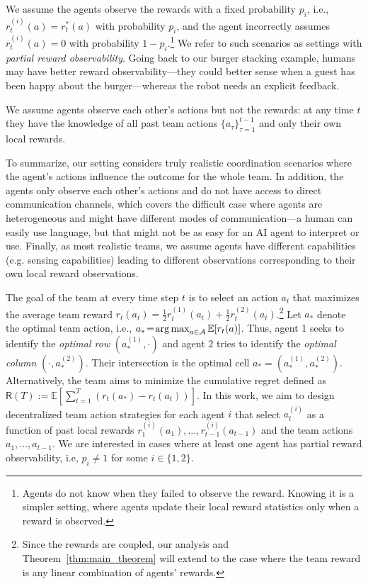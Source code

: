 \documentclass[letterpaper]{article} %
\theoremstyle{definition}
\def\expe{\mathbb{E}}   %
\def\argmax{\mathop{\rm arg\,max}}
\def\reg{\mathsf{R}}
\def\mc{\mathcal}
\begin{document}
We assume the agents observe the rewards with a fixed probability $p_i$, i.e., $r^{(i)}_t(a) = r^{\ast}_t(a)$ with probability $p_i$, and the agent incorrectly assumes $r^{(i)}_t(a) = 0$ with probability $1-p_i$.\footnote{Agents do not know when they failed to observe the reward. Knowing it is a simpler setting, where agents update their local reward statistics only when a reward is observed.} 
We refer to such scenarios as settings with \emph{partial reward observability}. Going back to our burger stacking example, humans may have better reward observability---they could better sense when a guest has been happy about the burger---whereas the robot needs an explicit feedback.

We assume agents observe each other's actions but not the rewards: at any time $t$ they have the knowledge of all past team actions $\{a_{\tau}\}_{\tau =1}^{t-1}$ and only their own local rewards. 

To summarize, our setting considers truly realistic coordination scenarios where the agent's actions influence the outcome for the whole team. In addition, the agents only observe each other's actions and do not have access to direct communication channels, which covers the difficult case where agents are heterogeneous and might have different modes of communication---a human can easily use language, but that might not be as easy for an AI agent to interpret or use. Finally, as most realistic teams, we assume agents have different capabilities (e.g. sensing capabilities) leading to different observations corresponding to their own local reward observations.

The goal of the team at every time step $t$ is to select an action $a_t$ that maximizes the average team reward $r_t(a_t) \!=\! \frac{1}{2}r^{(1)}_t(a_t) + \frac{1}{2}r^{(2)}_t(a_t)$.\footnote{Since the rewards are coupled, our analysis and Theorem~\ref{thm:main_theorem} will extend to the case where the team reward is any linear combination of agents' rewards.} Let $a_{\ast}$ denote the optimal team action, i.e., $a_{\ast} \!=\! \argmax_{a \in \mc{A}} \expe[r_t(a)]$. Thus, agent 1 seeks to identify the \textit{optimal row}  $(a_{\ast}^{(1)}, \cdot)$ and agent 2 tries to identify the \textit{optimal column} $(\cdot, a_{\ast}^{(2)})$. Their intersection is the optimal cell $a_{\ast}\! =\! (a_{\ast}^{(1)}, a_{\ast}^{(2)})$. Alternatively, the team aims to minimize the cumulative regret defined as $\reg(T):= \expe\left[\sum_{t=1}^T \left(r_t(a_{\ast}) - r_t(a_t)\right) \right]$.
In this work, we aim to design decentralized team action strategies for each agent $i$ that select $a^{(i)}_t$ as a function of past local rewards $r^{(i)}_1(a_1), \ldots, r^{(i)}_{t-1}(a_{t-1})$ and the team actions $a_1, \ldots, a_{t-1}$. We are interested in cases where at least one agent has partial reward observability, i.e, $p_i \neq 1$ for some $i \in \{1,2\}$. 
\end{document}
